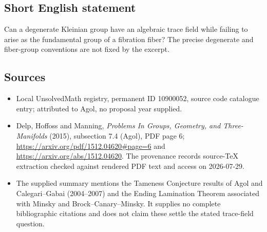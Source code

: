 \documentclass[11pt]{article}
\begin{document}
\subsection{Short English statement}
Can a degenerate Kleinian group have an algebraic trace field while failing to arise as the fundamental group of a fibration fiber? The precise degenerate and fiber-group conventions are not fixed by the excerpt.
\subsection{Sources}
\begin{itemize}
\item Local UnsolvedMath registry, permanent ID 10900052, source code catalogue entry; attributed to Agol, no proposal year supplied.
\item Delp, Hoffoss and Manning, \emph{Problems In Groups, Geometry, and Three-Manifolds} (2015), subsection 7.4 (Agol), PDF page 6; \url{https://arxiv.org/pdf/1512.04620#page=6} and \url{https://arxiv.org/abs/1512.04620}. The provenance records source-TeX extraction checked against rendered PDF text and access on 2026-07-29.
\item The supplied summary mentions the Tameness Conjecture results of Agol and Calegari--Gabai (2004--2007) and the Ending Lamination Theorem associated with Minsky and Brock--Canary--Minsky. It supplies no complete bibliographic citations and does not claim these settle the stated trace-field question.
\end{itemize}
\end{document}
